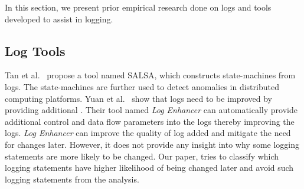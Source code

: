 
In this section, we present prior empirical research done on logs and tools developed to assist in logging.


\subsection{Log Tools}


%
%

Tan {et al}$ . $~\cite{TanSalsa} propose a tool named SALSA, which constructs state-machines from logs. The state-machines are further used to detect anomalies in distributed computing platforms. Yuan {et al$ . $}~\cite{Yuan} show that logs need to be improved by providing additional . Their tool named \emph{Log Enhancer} can automatically provide additional control and data flow parameters into the logs thereby improving the logs. \emph{Log Enhancer} can improve the quality of log added and mitigate the need for changes later. However, it does not provide any insight into why some logging statements are more likely to be changed. Our paper, tries to classify which logging statements have higher likelihood of being changed later and avoid such logging statements from the analysis. 


